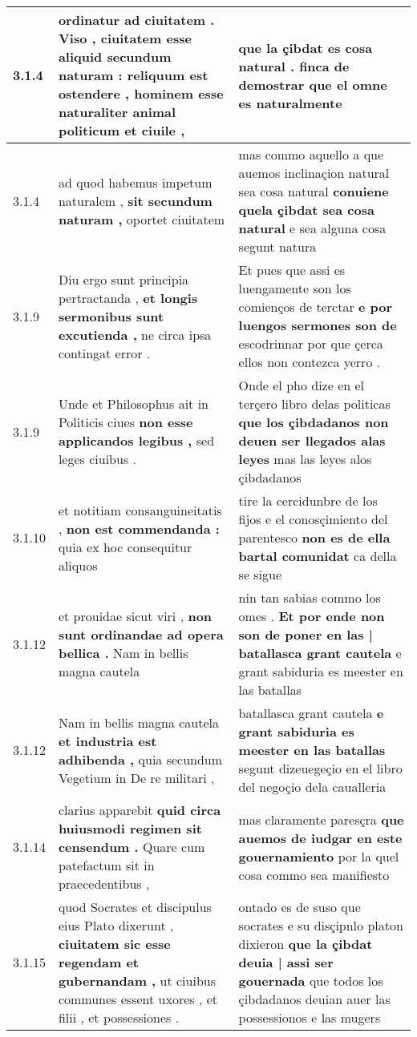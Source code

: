 \begin{tabular}{|p{1cm}|p{6.5cm}|p{6.5cm}|}
3.1.4 & ordinatur ad ciuitatem . Viso , ciuitatem esse aliquid secundum naturam : \textbf{ reliquum est ostendere , } hominem esse naturaliter animal politicum et ciuile , & que la çibdat es cosa natural . \textbf{ finca de demostrar } que el omne es naturalmente \\\hline
3.1.4 & ad quod habemus impetum naturalem , \textbf{ sit secundum naturam , } oportet ciuitatem & mas commo aquello a que auemos inclinaçion natural sea cosa natural \textbf{ conuiene quela çibdat sea cosa natural } e sea alguna cosa segunt natura \\\hline
3.1.9 & Diu ergo sunt principia pertractanda , \textbf{ et longis sermonibus sunt excutienda , } ne circa ipsa contingat error . & Et pues que assi es luengamente son los comienços de terctar \textbf{ e por luengos sermones son de } escodrinnar por que çerca ellos non contezca yerro . \\\hline
3.1.9 & Unde et Philosophus ait in Politicis ciues \textbf{ non esse applicandos legibus , } sed leges ciuibus . & Onde el pho dize en el terçero libro delas politicas \textbf{ que los çibdadanos non deuen ser llegados alas leyes } mas las leyes alos çibdadanos \\\hline
3.1.10 & et notitiam consanguineitatis , \textbf{ non est commendanda : } quia ex hoc consequitur aliquos & tire la cercidunbre de los fijos e el conosçimiento del parentesco \textbf{ non es de ella bartal comunidat } ca della se sigue \\\hline
3.1.12 & et prouidae sicut viri , \textbf{ non sunt ordinandae ad opera bellica . } Nam in bellis magna cautela & nin tan sabias commo los omes . \textbf{ Et por ende non son de poner en las | batallasca grant cautela } e grant sabiduria es meester en las batallas \\\hline
3.1.12 & Nam in bellis magna cautela \textbf{ et industria est adhibenda , } quia secundum Vegetium in De re militari , & batallasca grant cautela \textbf{ e grant sabiduria es meester en las batallas } segunt dizeuegeçio en el libro del negoçio dela caualleria \\\hline
3.1.14 & clarius apparebit \textbf{ quid circa huiusmodi regimen sit censendum . } Quare cum patefactum sit in praecedentibus , & mas claramente paresçra \textbf{ que auemos de iudgar en este gouernamiento } por la quel cosa commo sea manifiesto \\\hline
3.1.15 & quod Socrates et discipulus eius Plato dixerunt , \textbf{ ciuitatem sic esse regendam et gubernandam , } ut ciuibus communes essent uxores , et filii , et possessiones . & ontado es de suso que socrates e su disçipnlo platon dixieron \textbf{ que la çibdat deuia | assi ser gouernada } que todos los çibdadanos deuian auer las possessionos e las mugers \\\hline

\end{tabular}
